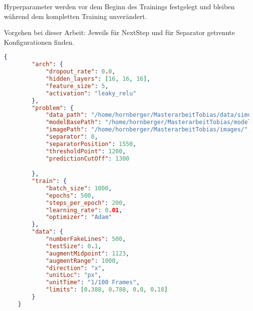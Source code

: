 Hyperparameter werden vor dem Beginn des Trainings festgelegt und bleiben während dem kompletten Training unverändert.


Vorgehen bei dieser Arbeit: Jeweils für NextStep und für Separator getrennte Konfigurationen finden.

\noindent\begin{minipage}{\textwidth}
\begin{lstlisting}[language=json,firstnumber=1, caption={Beispiel eines Hyperparameter Files in JSON}, captionpos=b, label=lst-hyperparam]
    {
        "arch": {
            "dropout_rate": 0.0,
            "hidden_layers": [16, 16, 16],
            "feature_size": 5,
            "activation": "leaky_relu"
        },
        "problem": {
            "data_path": "/home/hornberger/MasterarbeitTobias/data/simulated/SpheresDownsampled",
            "modelBasePath": "/home/hornberger/MasterarbeitTobias/models/simulated/",
            "imagePath": "/home/hornberger/MasterarbeitTobias/images/",
            "separator": 0,
            "separatorPosition": 1550,
            "thresholdPoint": 1200,
            "predictionCutOff": 1300

        },
        "train": {
            "batch_size": 1000,
            "epochs": 500,
            "steps_per_epoch": 200,
            "learning_rate": 0.01,
            "optimizer": "Adam"
        },
        "data": {
            "numberFakeLines": 500,
            "testSize": 0.1,
            "augmentMidpoint": 1123,
            "augmentRange": 1000,
            "direction": "x",
            "unitLoc": "px",
            "unitTime": "1/100 Frames",    
            "limits": [0.388, 0.788, 0.0, 0.18]
        }
    }

    
\end{lstlisting}
\end{minipage}
    

